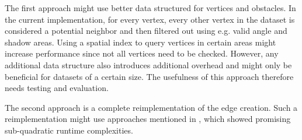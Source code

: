 		The first approach might use better data structured for vertices and obstacles.
		In the current implementation, for every vertex, every other vertex in the dataset is considered a potential neighbor and then filtered out using e.g. valid angle and shadow areas.
		Using a spatial index to query vertices in certain areas might increase performance since not all vertices need to be checked.
		However, any additional data structure also introduces additional overhead and might only be beneficial for datasets of a certain size.
		The usefulness of this approach therefore needs testing and evaluation.
		
		The second approach is a complete reimplementation of the edge creation.
		Such a reimplementation might use approaches mentioned in , which showed promising sub-quadratic runtime complexities.
		
